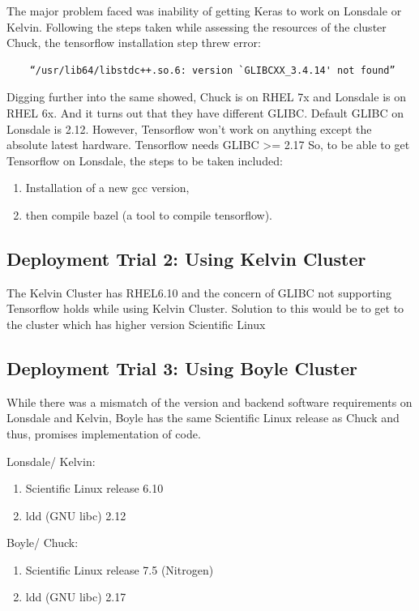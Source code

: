 The major problem faced was inability of getting Keras to work on Lonsdale or Kelvin. Following the steps taken while assessing the resources of the cluster Chuck, the tensorflow installation step threw error: 

\begin{verbatim}
    “/usr/lib64/libstdc++.so.6: version `GLIBCXX_3.4.14' not found”
\end{verbatim}

Digging further into the same showed, Chuck is on RHEL 7x and Lonsdale is on RHEL 6x. And it turns out that they have different GLIBC.  Default GLIBC on Lonsdale is 2.12. However, Tensorflow won’t work on anything except the absolute latest hardware. Tensorflow needs GLIBC >= 2.17
So, to be able to get Tensorflow on Lonsdale, the steps to be taken included:
\begin{enumerate}
	\item Installation of a new gcc version, 
	\item then compile bazel (a tool to compile tensorflow).
\end{enumerate}

\subsection{Deployment Trial 2: Using Kelvin Cluster}


The Kelvin Cluster has RHEL6.10 and the concern of GLIBC not supporting Tensorflow holds while using Kelvin Cluster. Solution to this would be to get to the cluster which has higher version Scientific Linux


\subsection{Deployment Trial 3: Using Boyle Cluster}

While there was a mismatch of the version and backend software requirements on Lonsdale and Kelvin, Boyle has the same Scientific Linux release as Chuck and thus, promises implementation of code. 

Lonsdale/ Kelvin:
\begin{enumerate}
	\item Scientific Linux release 6.10
	\item ldd (GNU libc) 2.12
\end{enumerate}


Boyle/ Chuck:
\begin{enumerate}
	\item Scientific Linux release 7.5 (Nitrogen)
	\item ldd (GNU libc) 2.17
\end{enumerate}

